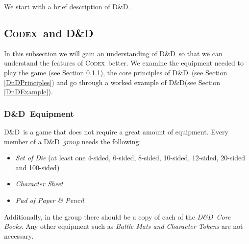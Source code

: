 \documentclass[review]{cmpreport}
\newcommand{\dnd}{D\&D}
\newcommand{\Codex}{\textsc{Codex}}
\begin{document}
	We start with a brief description of \dnd. 
	
	\subsection{\Codex \ and \dnd} \label{DnDRules&Lit}
	In this subsection we will gain an understanding of \dnd \ so that we can understand the features of \Codex \ better. We examine the equipment needed to play the game (see Section \ref{DnDEquipment}), the core principles of \dnd \ (see Section \ref{DnDPrinciples}) and go through a worked example of \dnd (see Section \ref{DnDExample}).

	\subsubsection{\dnd \ Equipment} \label{DnDEquipment}
	\dnd \ is a game that does not require a great amount of equipment. Every member of a \dnd \ \emph{group} needs the following:
	\begin{itemize}
		\item \emph{Set of Die} (at least one 4-sided, 6-sided, 8-sided, 10-sided, 12-sided, 20-sided and 100-sided)
		\item \emph{Character Sheet}
		\item \emph{Pad of Paper \& Pencil}
	\end{itemize}
	Additionally, in the group there should be a copy of each of the \emph{\dnd \ Core Books}. Any other equipment such as \emph{Battle Mats and Character Tokens} are not necessary.
	
\end{document}
